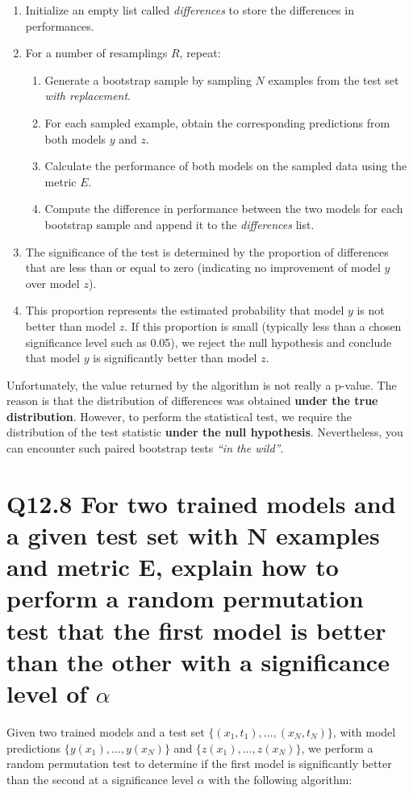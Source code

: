 \documentclass[11pt]{article}
\begin{document}
\begin{enumerate}
    \item Initialize an empty list called \textit{differences} to store the differences in performances.
    \item For a number of resamplings \(R\), repeat:
    \begin{enumerate}
        \item Generate a bootstrap sample by sampling \(N\) examples from the test set \textit{with replacement}.
        \item For each sampled example, obtain the corresponding predictions from both models \(y\) and \(z\).
        \item Calculate the performance of both models on the sampled data using the metric \(E\).
        \item Compute the difference in performance between the two models for each bootstrap sample and append it to the \textit{differences} list.
    \end{enumerate}
    \item The significance of the test is determined by the proportion of differences that are less than or equal to zero (indicating no improvement of model \(y\) over model \(z\)).
    \item This proportion represents the estimated probability that model \(y\) is not better than model \(z\). If this proportion is small (typically less than a chosen significance level such as 0.05), we reject the null hypothesis and conclude that model \(y\) is significantly better than model \(z\).
\end{enumerate}

Unfortunately, the value returned by the algorithm is not really a p-value. The reason is that the distribution of differences was obtained \textbf{under the true distribution}. However, to perform the statistical test, we require the distribution of the test statistic \textbf{under the null hypothesis}. Nevertheless, you can encounter such paired bootstrap tests \textit{``in the wild''}.

\section{Q12.8 For two trained models and a given test set with N examples and metric E, explain how to perform a random permutation test that the first model is better than the other with a significance level of $\alpha$}

Given two trained models and a test set $\{ (x_1, t_1), \ldots, (x_N, t_N) \}$, with model predictions $\{y(x_1), \ldots, y(x_N)\}$ and $\{z(x_1), \ldots, z(x_N)\}$, we perform a random permutation test to determine if the first model is significantly better than the second at a significance level \( \alpha \) with the following algorithm:
\end{document}
